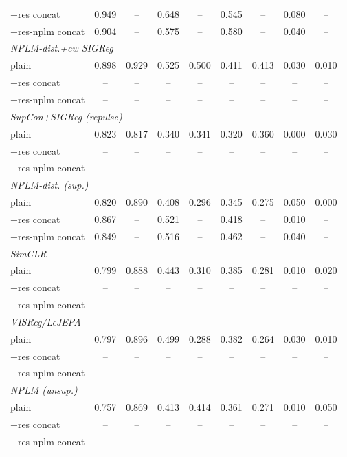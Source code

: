 \begin{landscape}
\begin{center}
\begin{longtable}{lcccccccc}
\quad +res concat & 0.949 & -- & 0.648 & -- & 0.545 & -- & 0.080 & -- \\
\quad +res-nplm concat & 0.904 & -- & 0.575 & -- & 0.580 & -- & 0.040 & -- \\
\multicolumn{9}{l}{\emph{NPLM-dist.+cw SIGReg}} \\
\quad plain & 0.898 & 0.929 & 0.525 & 0.500 & 0.411 & 0.413 & 0.030 & 0.010 \\
\quad +res concat & -- & -- & -- & -- & -- & -- & -- & -- \\
\quad +res-nplm concat & -- & -- & -- & -- & -- & -- & -- & -- \\
\multicolumn{9}{l}{\emph{SupCon+SIGReg (repulse)}} \\
\quad plain & 0.823 & 0.817 & 0.340 & 0.341 & 0.320 & 0.360 & 0.000 & 0.030 \\
\quad +res concat & -- & -- & -- & -- & -- & -- & -- & -- \\
\quad +res-nplm concat & -- & -- & -- & -- & -- & -- & -- & -- \\
\multicolumn{9}{l}{\emph{NPLM-dist. (sup.)}} \\
\quad plain & 0.820 & 0.890 & 0.408 & 0.296 & 0.345 & 0.275 & 0.050 & 0.000 \\
\quad +res concat & 0.867 & -- & 0.521 & -- & 0.418 & -- & 0.010 & -- \\
\quad +res-nplm concat & 0.849 & -- & 0.516 & -- & 0.462 & -- & 0.040 & -- \\
\multicolumn{9}{l}{\emph{SimCLR}} \\
\quad plain & 0.799 & 0.888 & 0.443 & 0.310 & 0.385 & 0.281 & 0.010 & 0.020 \\
\quad +res concat & -- & -- & -- & -- & -- & -- & -- & -- \\
\quad +res-nplm concat & -- & -- & -- & -- & -- & -- & -- & -- \\
\multicolumn{9}{l}{\emph{VISReg/LeJEPA}} \\
\quad plain & 0.797 & 0.896 & 0.499 & 0.288 & 0.382 & 0.264 & 0.030 & 0.010 \\
\quad +res concat & -- & -- & -- & -- & -- & -- & -- & -- \\
\quad +res-nplm concat & -- & -- & -- & -- & -- & -- & -- & -- \\
\multicolumn{9}{l}{\emph{NPLM (unsup.)}} \\
\quad plain & 0.757 & 0.869 & 0.413 & 0.414 & 0.361 & 0.271 & 0.010 & 0.050 \\
\quad +res concat & -- & -- & -- & -- & -- & -- & -- & -- \\
\quad +res-nplm concat & -- & -- & -- & -- & -- & -- & -- & -- \\
\end{longtable}
\end{center}
\end{landscape}
